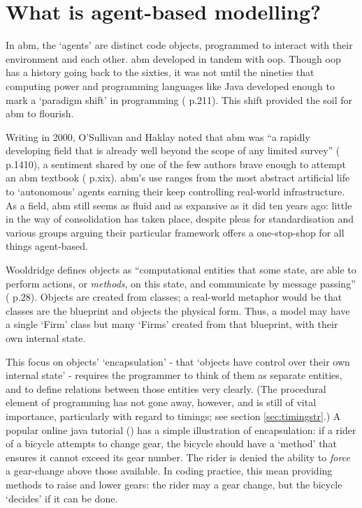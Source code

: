 \section{What is agent-based modelling? \label{sec:abmiswhat}}

In \gls{abm}, the `agents' are distinct code objects, programmed to interact with their environment and each other. \gls{abm} developed in tandem with \gls{oop}. Though \gls{oop} has a history going back to the sixties, it was not until the nineties that computing power and programming languages like Java developed enough to mark a `paradigm shift' in programming (\citealt{robinson_emergence_2009} p.211). This shift provided the soil for \gls{abm} to flourish. 

Writing in 2000, O'Sullivan and Haklay noted that \gls{abm} was ``a rapidly developing field that is already well beyond the scope of any limited survey'' (\citealt{osullivan_agent-based_2000} p.1410), a sentiment shared by one of the few authors brave enough to attempt an \gls{abm} textbook (\citealt{wooldridge_introduction_2009} p.xix). \gls{abm}'s use ranges from the most abstract artificial life to `autonomous' agents earning their keep controlling real-world infrastructure. As a field, \gls{abm} still seems as fluid and as expansive as it did ten years ago: little in the way of consolidation has taken place, despite pleas for standardisation and various groups arguing their particular framework offers a one-stop-shop for all things agent-based. 

Wooldridge defines objects as ``computational entities that  some state, are able to perform actions, or \emph{methods}, on this state, and communicate by message passing'' (\citealt{wooldridge_introduction_2009} p.28). Objects are created from classes; a real-world metaphor would be that classes are the blueprint and objects the physical form. Thus, a model may have a single `Firm' class but many `Firms' created from that blueprint, with their own internal state.

This focus on objects' `encapsulation' - that `objects have control over their own internal state' - requires the programmer to think of them as separate entities, and to define relations between those entities very clearly. (The procedural element of programming has not gone away, however, and is still of vital importance, particularly with regard to timings; see section \ref{sec:timingstr}.) A popular online java tutorial (\citeyear{sun_what_1995}) has a simple illustration of encapsulation: if a rider of a bicycle attempts to change gear, the bicycle should have a `method' that ensures it cannot exceed its gear number. The rider is denied the ability to \emph{force} a gear-change above those available. In coding practice, this mean providing methods to raise and lower gears: the rider may  a gear change, but the bicycle `decides' if it can be done.

